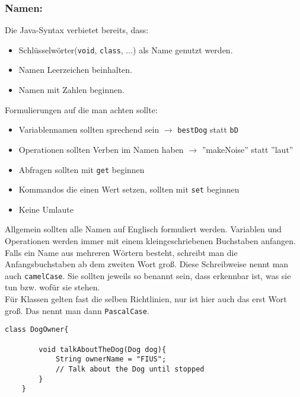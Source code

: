 \vspace{5mm}

\subsubsection*{Namen:}

\begin{Infobox}
	Die Java-Syntax verbietet bereits, dass:
	
	\begin{itemize}
		\item Schlüsselwörter(\lstinline{void}, \lstinline{class}, ...) als Name genutzt werden.
		\item Namen Leerzeichen beinhalten.
		\item Namen mit Zahlen beginnen.
	\end{itemize}
\end{Infobox}
\vspace{5mm}
\begin{Infobox}
	Formulierungen auf die man achten sollte:
	\begin{itemize}
		\item Variablennamen sollten sprechend sein $\rightarrow$ \lstinline{bestDog} statt \lstinline{bD}
		\item Operationen sollten Verben im Namen haben $\rightarrow$ ''makeNoise'' statt ''laut''
		\item Abfragen sollten mit \lstinline{get} beginnen
		\item Kommandos die einen Wert setzen, sollten mit \lstinline{set} beginnen
		\item Keine Umlaute
		
	\end{itemize}
\end{Infobox}

\noindent
Allgemein sollten alle Namen auf Englisch formuliert werden.
Variablen und Operationen werden immer mit einem kleingeschriebenen Buchstaben anfangen.
Falls ein Name aus mehreren Wörtern besteht, schreibt man die Anfangsbuchstaben ab dem zweiten Wort groß.
Diese Schreibweise nennt man auch \lstinline{camelCase}.
Sie sollten jeweils so benannt sein, dass erkennbar ist, was sie tun bzw. wofür sie stehen.\\
Für Klassen gelten fast die selben Richtlinien, nur ist hier auch das erst Wort groß.
Das nennt man dann \lstinline{PascalCase}.

\begin{lstlisting}[title=\textbf{Beispiel gute Namensgebung}]
	class DogOwner{
		
		void talkAboutTheDog(Dog dog){
			String ownerName = "FIUS";
			// Talk about the Dog until stopped
		}
	}
\end{lstlisting}

